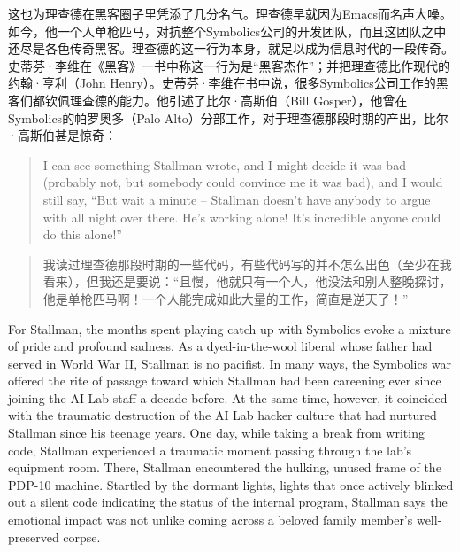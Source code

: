 \ifdefined\chs
这也为理查德在黑客圈子里凭添了几分名气。理查德早就因为Emacs而名声大噪。如今，他一个人单枪匹马，对抗整个Symbolics公司的开发团队，而且这团队之中还尽是各色传奇黑客。理查德的这一行为本身，就足以成为信息时代的一段传奇。史蒂芬·李维在《黑客》一书中称这一行为是``黑客杰作''；并把理查德比作现代的约翰·亨利（John Henry）。史蒂芬·李维在书中说，很多Symbolics公司工作的黑客们都钦佩理查德的能力。他引述了比尔·高斯伯（Bill Gosper），他曾在Symbolics的帕罗奥多（Palo Alto）分部工作，对于理查德那段时期的产出，比尔·高斯伯甚是惊奇：
\fi

\ifdefined\eng
\begin{quote}
I can see something Stallman wrote, and I might decide it was bad (probably not, but somebody could convince me it was bad), and I would still say, ``But wait a minute -- Stallman doesn't have anybody to argue with all night over there. He's working alone! It's incredible anyone could do this alone!''
\end{quote}
\fi

\ifdefined\chs
\begin{quote}
我读过理查德那段时期的一些代码，有些代码写的并不怎么出色（至少在我看来），但我还是要说：``且慢，他就只有一个人，他没法和别人整晚探讨，他是单枪匹马啊！一个人能完成如此大量的工作，简直是逆天了！''
\end{quote}
\fi

\ifdefined\eng
For Stallman, the months spent playing catch up with Symbolics evoke a mixture of pride and profound sadness. As a dyed-in-the-wool liberal whose father had served in World War II, Stallman is no pacifist. In many ways, the Symbolics war offered the rite of passage toward which Stallman had been careening ever since joining the AI Lab staff a decade before. At the same time, however, it coincided with the traumatic destruction of the AI Lab hacker culture that had nurtured Stallman since his teenage years. One day, while taking a break from writing code, Stallman experienced a traumatic moment passing through the lab's equipment room. There, Stallman encountered the hulking, unused frame of the PDP-10 machine. Startled by the dormant lights, lights that once actively blinked out a silent code indicating the status of the internal program, Stallman says the emotional impact was not unlike coming across a beloved family member's well-preserved corpse.
\fi

